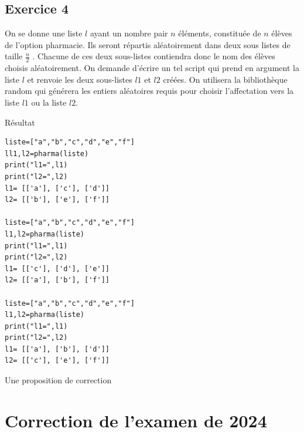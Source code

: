 \documentclass[a4paper,12pt]{article}
\begin{document}
\subsection{Exercice 4}
\begin{leftbar}
On se donne une liste $l$ ayant un nombre pair $n$ \'el\'ements, constitu\'ee de $n$  \'el\`eves de l'option pharmacie. Ils seront r\'epartis al\'eatoirement dans deux sous listes de taille $\frac{n}{2}$ . Chacune de ces deux sous-listes contiendra donc le nom des \'el\`eves choisis al\'eatoirement. On demande d'\'ecrire un tel script qui prend en argument la liste $l$ et renvoie les deux sous-listes $l1$ et $l2$ cr\'e\'ees. On utilisera la biblioth\`eque random qui g\'en\'erera les entiers al\'eatoires requis pour choisir l'affectation vers la liste $l1$ ou la liste $l2$.
 \end{leftbar}
 R\'esultat
\begin{verbatim}
liste=["a","b","c","d","e","f"]
ll1,l2=pharma(liste)
print("l1=",l1)
print("l2=",l2)
l1= [['a'], ['c'], ['d']]
l2= [['b'], ['e'], ['f']]

liste=["a","b","c","d","e","f"]
l1,l2=pharma(liste)
print("l1=",l1)
print("l2=",l2)
l1= [['c'], ['d'], ['e']]
l2= [['a'], ['b'], ['f']]

liste=["a","b","c","d","e","f"]
l1,l2=pharma(liste)
print("l1=",l1)
print("l2=",l2)
l1= [['a'], ['b'], ['d']]
l2= [['c'], ['e'], ['f']]
\end{verbatim}

Une proposition de correction



\clearpage
\section{Correction de l’examen de 2024}
\end{document}
